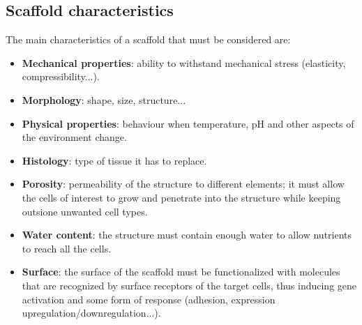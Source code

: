  \subsection{Scaffold characteristics}
    The main characteristics of a scaffold that must be considered are:
    \begin{itemize}
      \item \textbf{Mechanical properties}: ability to withstand mechanical stress (elasticity, compressibility...).
      \item \textbf{Morphology}: shape, size, structure...
      \item \textbf{Physical properties}: behaviour when temperature, pH and other aspects of the environment change.
      \item \textbf{Histology}: type of tissue it has to replace.
      \item \textbf{Porosity}: permeability of the structure to different elements; it must allow the cells of interest to grow and penetrate into the structure while keeping outsione unwanted cell types.
      \item \textbf{Water content}: the structure must contain enough water to allow nutrients to reach all the cells.
      \item \textbf{Surface}: the surface of the scaffold must be functionalized with molecules that are recognized by surface receptors of the target cells, thus inducing gene activation and some form of response (adhesion, expression upregulation/downregulation...).
    \end{itemize}
  
